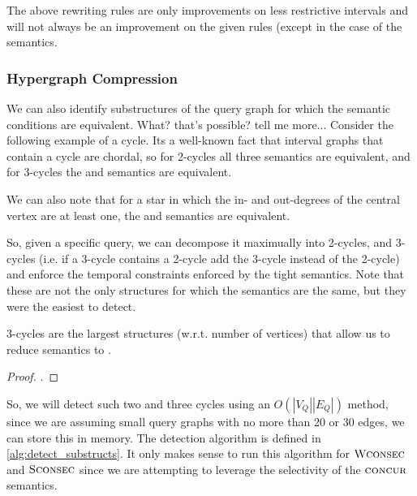 The above rewriting rules are only improvements on less restrictive intervals
and will not always be an improvement on the given rules (except in the case of
the \concurrent{} semantics. 


\subsubsection{Hypergraph Compression}

We can also identify substructures of the query graph for which the semantic
conditions are equivalent. What? that's possible? tell me more... Consider the
following example of a cycle. Its a well-known fact that interval graphs that
contain a cycle are chordal, so for 2-cycles all three semantics are equivalent,
and for 3-cycles the \concurrent{} and \strongConsec{} semantics are
equivalent.

We can also note that for a star in which the in- and out-degrees of the central
vertex are at least one, the \concurrent{} and \strongConsec{} semantics
are equivalent.

So, given a specific query, we can decompose it maximually into 2-cycles, and
3-cycles (i.e. if a 3-cycle contains a 2-cycle add the 3-cycle instead of the
2-cycle) and enforce the temporal constraints enforced by the tight
semantics. Note that these are not the only structures for which the semantics
are the same, but they were the easiest to detect.

\begin{conjecture}
  3-cycles are the largest structures (w.r.t. number of vertices) that allow us to
  reduce \strongConsec{} semantics to \concurrent{}.
\end{conjecture}

\begin{proof}
  .
\end{proof}

So, we will detect such two and three cycles using an $O(|V_Q||E_Q|)$ method,
since we are assuming small query graphs with no more than 20 or 30 edges, we
can store this in memory. The detection algorithm is defined in
\ref{alg:detect_substructs}. It only makes sense to run this algorithm for
$\textsc{Wconsec}$ and $\textsc{Sconsec}$ since we are attempting to leverage the
selectivity of the $\textsc{concur}$ semantics.

